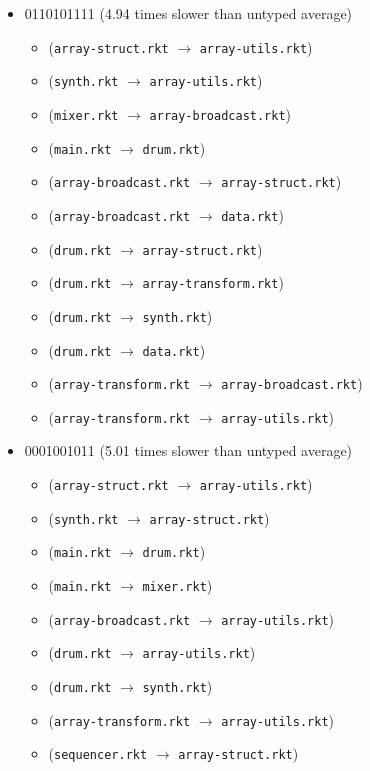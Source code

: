 \documentclass{article}
\newcommand{\mono}[1]{\texttt{#1}}
\begin{document}
\begin{itemize}
\begin{itemize}
  \end{itemize}
\item 0110101111 (4.94 times slower than untyped average)
  \begin{itemize}
  \item (\mono{array-struct.rkt} $\rightarrow$ \mono{array-utils.rkt})
  \item (\mono{synth.rkt} $\rightarrow$ \mono{array-utils.rkt})
  \item (\mono{mixer.rkt} $\rightarrow$ \mono{array-broadcast.rkt})
  \item (\mono{main.rkt} $\rightarrow$ \mono{drum.rkt})
  \item (\mono{array-broadcast.rkt} $\rightarrow$ \mono{array-struct.rkt})
  \item (\mono{array-broadcast.rkt} $\rightarrow$ \mono{data.rkt})
  \item (\mono{drum.rkt} $\rightarrow$ \mono{array-struct.rkt})
  \item (\mono{drum.rkt} $\rightarrow$ \mono{array-transform.rkt})
  \item (\mono{drum.rkt} $\rightarrow$ \mono{synth.rkt})
  \item (\mono{drum.rkt} $\rightarrow$ \mono{data.rkt})
  \item (\mono{array-transform.rkt} $\rightarrow$ \mono{array-broadcast.rkt})
  \item (\mono{array-transform.rkt} $\rightarrow$ \mono{array-utils.rkt})
  \end{itemize}
\item 0001001011 (5.01 times slower than untyped average)
  \begin{itemize}
  \item (\mono{array-struct.rkt} $\rightarrow$ \mono{array-utils.rkt})
  \item (\mono{synth.rkt} $\rightarrow$ \mono{array-struct.rkt})
  \item (\mono{main.rkt} $\rightarrow$ \mono{drum.rkt})
  \item (\mono{main.rkt} $\rightarrow$ \mono{mixer.rkt})
  \item (\mono{array-broadcast.rkt} $\rightarrow$ \mono{array-utils.rkt})
  \item (\mono{drum.rkt} $\rightarrow$ \mono{array-utils.rkt})
  \item (\mono{drum.rkt} $\rightarrow$ \mono{synth.rkt})
  \item (\mono{array-transform.rkt} $\rightarrow$ \mono{array-utils.rkt})
  \item (\mono{sequencer.rkt} $\rightarrow$ \mono{array-struct.rkt})

\end{itemize}
\end{itemize}
\end{document}
